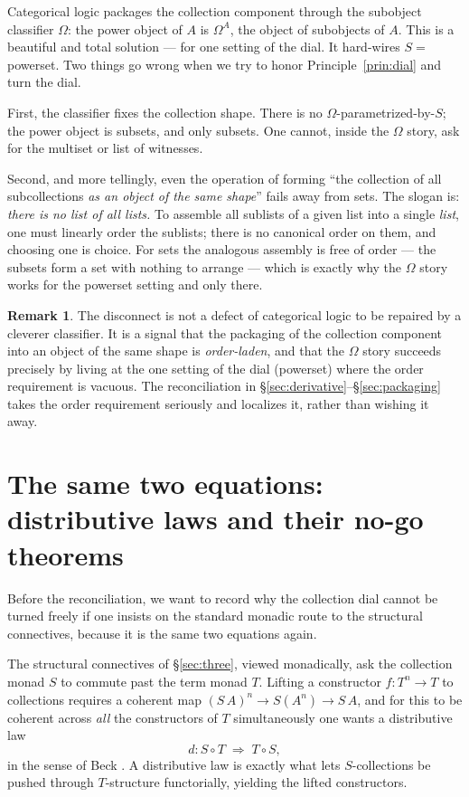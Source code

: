 \documentclass[11pt]{article}
\theoremstyle{definition}
\newtheorem{remark}[definition]{Remark}
\theoremstyle{plain}
\newcommand{\T}{T}
\newcommand{\Coll}{S}
\begin{document}
Categorical logic packages the collection component through the subobject
classifier $\Omega$: the power object of $A$ is $\Omega^{A}$, the object of
subobjects of $A$. This is a beautiful and total solution --- for one setting
of the dial. It hard-wires $\Coll = $ powerset. Two things go wrong when we
try to honor Principle~\ref{prin:dial} and turn the dial.

First, the classifier fixes the collection shape. There is no
$\Omega$-parametrized-by-$\Coll$; the power object is subsets, and only
subsets. One cannot, inside the $\Omega$ story, ask for the multiset or list
of witnesses.

Second, and more tellingly, even the operation of forming ``the collection of
all subcollections \emph{as an object of the same shape}'' fails away from
sets. The slogan is: \emph{there is no list of all lists.} To assemble all
sublists of a given list into a single \emph{list}, one must linearly order
the sublists; there is no canonical order on them, and choosing one is choice.
For sets the analogous assembly is free of order --- the subsets form a set
with nothing to arrange --- which is exactly why the $\Omega$ story works for
the powerset setting and only there.

\begin{remark}
The disconnect is not a defect of categorical logic to be repaired by a
cleverer classifier. It is a signal that the packaging of the collection
component into an object of the same shape is \emph{order-laden}, and that the
$\Omega$ story succeeds precisely by living at the one setting of the dial
(powerset) where the order requirement is vacuous. The reconciliation in
\S\ref{sec:derivative}--\S\ref{sec:packaging} takes the order requirement
seriously and localizes it, rather than wishing it away.
\end{remark}

\section{The same two equations: distributive laws and their no-go theorems}
\label{sec:nogo}

Before the reconciliation, we want to record why the collection dial cannot be
turned freely if one insists on the standard monadic route to the structural
connectives, because it is the same two equations again.

The structural connectives of \S\ref{sec:three}, viewed monadically, ask the
collection monad $\Coll$ to commute past the term monad $\T$. Lifting a
constructor $f : \T^{n} \to \T$ to collections requires a coherent map
$(\Coll\,A)^{n} \to \Coll(A^{n}) \to \Coll\,A$, and for this to be coherent
across \emph{all} the constructors of $\T$ simultaneously one wants a
distributive law
\[
  d : \Coll \circ \T \;\Rightarrow\; \T \circ \Coll,
\]
in the sense of Beck \cite{Beck69}. A distributive law is exactly what lets
$\Coll$-collections be pushed through $\T$-structure functorially, yielding
the lifted constructors.
\end{document}
